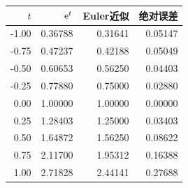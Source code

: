 \begin{center}\begin{tabular}{rrrr}\toprule $t$&$\mathrm e^t$&Euler近似&绝对误差\\\midrule
-1.00&0.36788&0.31641&0.05147\\
-0.75&0.47237&0.42188&0.05049\\
-0.50&0.60653&0.56250&0.04403\\
-0.25&0.77880&0.75000&0.02880\\
0.00&1.00000&1.00000&0.00000\\
0.25&1.28403&1.25000&0.03403\\
0.50&1.64872&1.56250&0.08622\\
0.75&2.11700&1.95312&0.16388\\
1.00&2.71828&2.44141&0.27688\\
\bottomrule\end{tabular}\end{center}